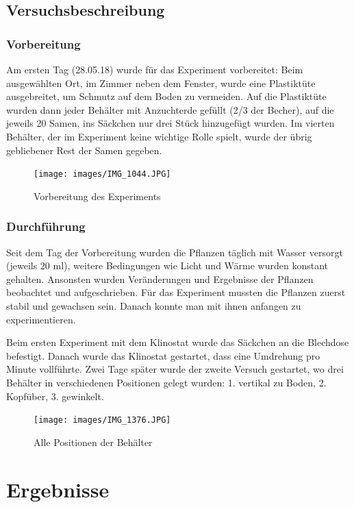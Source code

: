 \documentclass[
a4paper, 
11pt, 
ngerman,
listof=totoc,
bibliography=totocnumbered,
abstracton
]{scrreprt}
\begin{document}
\subsection{Versuchsbeschreibung}

\subsubsection{Vorbereitung}

Am ersten Tag (28.05.18) wurde für das Experiment vorbereitet: Beim ausgewählten Ort, im Zimmer neben dem Fenster, wurde eine Plastiktüte ausgebreitet, um Schmutz auf dem Boden zu vermeiden. Auf die Plastiktüte wurden dann jeder Behälter mit Anzuchterde gefüllt (2/3 der Becher), auf die jeweils 20 Samen, ins Säckchen nur drei Stück hinzugefügt wurden. Im vierten Behälter, der im Experiment keine wichtige Rolle spielt, wurde der übrig gebliebener Rest der Samen gegeben.


\begin{figure}[H]
	\centering 
	\texttt{[image: images/IMG\_1044.JPG]}
	\caption{Vorbereitung des Experiments}
\end{figure}



\subsubsection{Durchführung}

Seit dem Tag der Vorbereitung wurden die Pflanzen täglich mit Wasser versorgt (jeweils 20 ml), weitere Bedingungen wie Licht und Wärme wurden konstant gehalten. Ansonsten wurden Veränderungen und Ergebnisse der Pflanzen beobachtet und aufgeschrieben.
Für das Experiment mussten die Pflanzen zuerst stabil und gewachsen sein. Danach konnte man mit ihnen anfangen zu experimentieren.

Beim ersten Experiment mit dem Klinostat wurde das Säckchen an die Blechdose befestigt. Danach wurde das Klinostat gestartet, dass eine Umdrehung pro Minute vollführte. Zwei Tage später wurde der zweite Versuch gestartet, wo drei Behälter in verschiedenen Positionen gelegt wurden: 1. vertikal zu Boden, 2. Kopfüber, 3. gewinkelt.


\begin{figure}[H]
	\centering 
	\texttt{[image: images/IMG\_1376.JPG]}
	\caption{Alle Positionen der Behälter}
\end{figure} 


\section{Ergebnisse}
\end{document}
